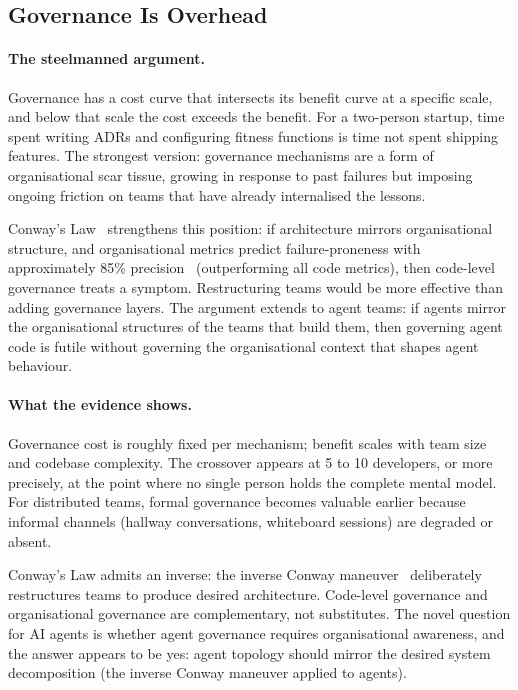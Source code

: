 \documentclass[11pt, a4paper, logo, copyright]{googledeepmind}
\begin{document}
\subsection{Governance Is Overhead}
\label{sec:contrarian-overhead}

\paragraph{The steelmanned argument.}
Governance has a cost curve that intersects its benefit curve at a specific
scale, and below that scale the cost exceeds the benefit.  For a two-person
startup, time spent writing ADRs and configuring fitness functions is time not
spent shipping features.  The strongest version: governance mechanisms are a
form of organisational scar tissue, growing in response to past failures but
imposing ongoing friction on teams that have already internalised the lessons.

Conway's Law~\citep{conway1968} strengthens this position: if architecture
mirrors organisational structure, and organisational metrics predict
failure-proneness with approximately 85\% precision~\citep{nagappan2008}
(outperforming all code metrics), then code-level governance treats a symptom.
Restructuring teams would be more effective than adding governance layers.  The
argument extends to agent teams: if agents mirror the organisational structures
of the teams that build them, then governing agent code is futile without
governing the organisational context that shapes agent behaviour.

\paragraph{What the evidence shows.}
Governance cost is roughly fixed per mechanism; benefit scales with team size
and codebase complexity.  The crossover appears at 5 to 10 developers, or more
precisely, at the point where no single person holds the complete mental model.
For distributed teams, formal governance becomes valuable earlier because
informal channels (hallway conversations, whiteboard sessions) are degraded or
absent.

Conway's Law admits an inverse: the inverse Conway
maneuver~\citep{skelton2019} deliberately restructures teams to produce desired
architecture.  Code-level governance and organisational governance are
complementary, not substitutes.  The novel question for AI agents is whether
agent governance requires organisational awareness, and the answer appears to be
yes: agent topology should mirror the desired system decomposition (the inverse
Conway maneuver applied to agents).
\end{document}
